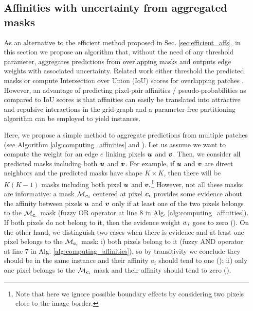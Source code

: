 \subsection{Affinities with uncertainty from aggregated masks}\label{sec:aggr_affs}
As an alternative to the efficient method proposed in Sec. \ref{sec:efficient_affs}, in this section we propose an algorithm that, without the need of any threshold parameter, aggregates predictions from overlapping \maskname masks and outputs edge weights with associated uncertainty.
Related work either threshold the predicted \maskname masks \cite{januszewski2018high,hirsch2020patchperpix,meirovitch2016multi} or compute Intersection over Union (IoU) scores for overlapping patches \cite{liu2016multi}. However, an advantage of predicting pixel-pair affinities / pseudo-probabilities as compared to IoU scores is that affinities can easily be translated into attractive and repulsive interactions in the grid-graph 
and a parameter-free partitioning algorithm can be employed to yield instances.

Here, we propose a simple method to aggregate predictions from multiple patches (see Algorithm \ref{alg:computing_affinities} and ). Let us assume we want to compute the weight for an edge $e$ linking pixels $\bm{u}$ and $\bm{v}$. Then, we consider all predicted \maskname masks including both $\bm{u}$ and $\bm{v}$. For example, if $\bm{u}$ and $\bm{v}$ are direct neighbors and the predicted masks have shape $K\times K$, then there will be $K(K-1)$ masks including both pixel $\bm{u}$ and $\bm{v}.$\footnote{Note that here we ignore possible boundary effects by considering two pixels close to the image border.} 
However, not all these masks are informative: a mask $\mathcal{M}_{\bm{c}_i}$ centered at pixel $\bm{c}_i$ provides some evidence about the affinity between pixels $\bm{u}$ and $\bm{v}$ only if at least one of the two pixels belongs to the $\mathcal{M}_{\bm{c}_i}$ mask (fuzzy OR operator at line 8 in Alg. \ref{alg:computing_affinities}).
If both pixels do not belong to it, then the evidence weight $w_i$ goes to zero ().
On the other hand, we distinguish two cases when there is evidence and at least one pixel belongs to the $\mathcal{M}_{\bm{c}_i}$ mask: i)
both pixels belong to it (fuzzy AND operator at line 7 in Alg. \ref{alg:computing_affinities}), so by transitivity we conclude they should be in the same instance and their affinity $a_i$ should tend to one (); 
ii) only one pixel belongs to the $\mathcal{M}_{\bm{c}_i}$ mask and their affinity should tend to zero (). 

